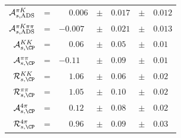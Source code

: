 \begin{center}
\begin{tabular}{rclclcl}
$\mathcal{A}_{s,\rm ADS}^{\pi K}$ &= & $\phantom{+}0.006$ & $\pm$ & $0.017$ & $\pm$ & $0.012$ \\
$\mathcal{A}_{s,\rm ADS}^{\pi K\pi\pi}$ &= & $-0.007$ & $\pm$ & $0.021$ & $\pm$ & $0.013$ \\
$\mathcal{A}_{s,\CP}^{KK}$ &= & $\phantom{+}0.06$ & $\pm$ & $0.05$ & $\pm$ & $0.01$ \\
$\mathcal{A}_{s,\CP}^{\pi\pi}$ &= & $-0.11$ & $\pm$ & $0.09$ & $\pm$ & $0.01$ \\
$\mathcal{R}_{s,\CP}^{KK}$ &= & $\phantom{+}1.06$ & $\pm$ & $0.06$ & $\pm$ & $0.02$ \\
$\mathcal{R}_{s,\CP}^{\pi\pi}$ &= & $\phantom{+}1.05$ & $\pm$ & $0.10$ & $\pm$ & $0.02$ \\
$\mathcal{A}_{s,\CP}^{4\pi}$ &= & $\phantom{+}0.12$ & $\pm$ & $0.08$ & $\pm$ & $0.02$ \\
$\mathcal{R}_{s,\CP}^{4\pi}$ &= & $\phantom{+}0.96$ & $\pm$ & $0.09$ & $\pm$ & $0.03$ \\
\end{tabular}
\end{center}
